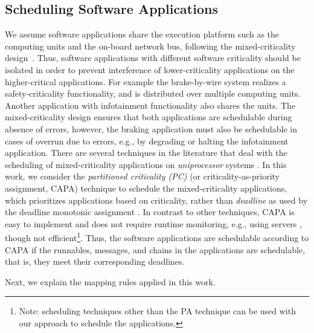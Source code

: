 \subsection{Scheduling Software Applications}
We assume software applications share the execution platform such as the computing units and the on-board network bus, following the mixed-criticality design~\cite{Vestal2007PreemptiveAssurance}. Thus, software applications with different software criticality should be isolated in order to prevent interference of lower-criticality applications on the higher-critical applications. For example the brake-by-wire system realizes a safety-criticality functionality, and is distributed over multiple computing units. Another application with infotainment functionality also shares the units. The mixed-criticality design ensures that both applications are schedulable during absence of errors, however, the braking application must also be schedulable in cases of overrun due to errors, e.g., by degrading or halting the infotainment application. There are several techniques in the literature that deal with the scheduling of mixed-criticality applications on \textit{uniprocessor} systems \cite{Vestal2007PreemptiveAssurance}. In this work, we consider the \textit{partitioned criticality (PC)} (or criticality-as-priority assignment, CAPA) technique to schedule the mixed-criticality applications, which prioritizes applications based on criticality, rather than \textit{deadline} as used by the deadline monotonic assignment \cite{Baruah2011Response-timeSystems}. In contrast to other techniques, CAPA is easy to implement and does not require runtime monitoring, e.g., using servers \cite{AbeniIntegratingSystems,Ashjaei2017DesigningSystems,Inam2014ThePlatforms}, though not efficient\footnote{Note: scheduling techniques other than the PA technique can be used with our approach to schedule the applications.}. Thus, the software  applications are schedulable according to CAPA if the runnables, messages, and chains in the applications are schedulable, that is, they meet their corresponding deadlines. 

Next, we explain the mapping rules applied in this work.

